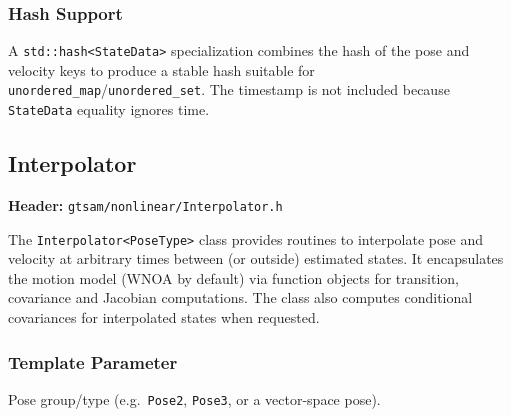 \documentclass[11pt]{report}
\begin{document}
\subsubsection*{Hash Support}
A \texttt{std::hash<StateData>} specialization combines the hash of the pose
and velocity keys to produce a stable hash suitable for
\texttt{unordered\_map}/\texttt{unordered\_set}. The timestamp is not included
because \texttt{StateData} equality ignores time.

\newpage
\subsection*{Interpolator}
\label{sec:api-interpolator}

\textbf{Header:} \texttt{gtsam/nonlinear/Interpolator.h}

\medskip\noindent
The \texttt{Interpolator<PoseType>} class provides routines to interpolate pose
and velocity at arbitrary times between (or outside) estimated states. It
encapsulates the motion model (WNOA by default) via function objects for
transition, covariance and Jacobian computations. The class also computes
conditional covariances for interpolated states when requested.

\subsubsection*{Template Parameter}
\begin{description}[style=nextline,leftmargin=2em]
	\item[\texttt{PoseType}] Pose group/type (e.g.\ \texttt{Pose2}, \texttt{Pose3}, or a vector-space pose).
\end{description}
\end{document}
